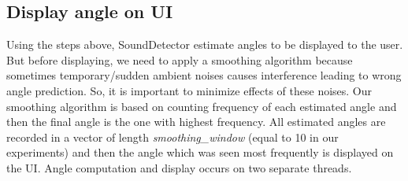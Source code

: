 
\subsection{Display angle on UI}
Using the steps above, SoundDetector estimate angles to be displayed to the user. But before displaying, we need to apply a smoothing algorithm because sometimes temporary/sudden ambient noises causes interference leading to wrong angle prediction. So, it is important to minimize effects of these noises. Our smoothing algorithm is based on counting frequency of each estimated angle and then the final angle is the one with highest frequency. All estimated angles are recorded in a vector of length \textit{smoothing\_window} (equal to 10 in our experiments) and then the angle which was seen most frequently is displayed on the UI. Angle computation and display occurs on two separate threads. 
